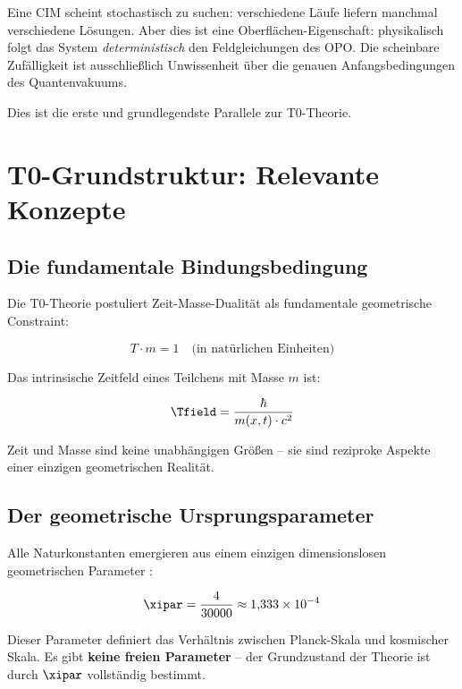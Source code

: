 Eine CIM scheint stochastisch zu suchen: verschiedene Läufe liefern manchmal 
verschiedene Lösungen. Aber dies ist eine Oberflächen-Eigenschaft: physikalisch 
folgt das System \emph{deterministisch} den Feldgleichungen des OPO. Die scheinbare 
Zufälligkeit ist ausschließlich Unwissenheit über die genauen Anfangsbedingungen 
des Quantenvakuums.

Dies ist die erste und grundlegendste Parallele zur T0-Theorie.

\clearpage

\section{T0-Grundstruktur: Relevante Konzepte}
\label{sec:t0}

\subsection{Die fundamentale Bindungsbedingung}

Die T0-Theorie postuliert Zeit-Masse-Dualität als fundamentale geometrische Constraint:

\begin{equation}
    T \cdot m = 1 \quad \text{(in natürlichen Einheiten)}
    \label{eq:t0_constraint}
\end{equation}

Das intrinsische Zeitfeld eines Teilchens mit Masse $m$ ist:

\begin{equation}
    \Tfield = \frac{\hbar}{m(x,t) \cdot c^2}
    \label{eq:t0_timefield}
\end{equation}

Zeit und Masse sind keine unabhängigen Größen -- sie sind reziproke Aspekte einer 
einzigen geometrischen Realität.

\subsection{Der geometrische Ursprungsparameter}

Alle Naturkonstanten emergieren aus einem einzigen dimensionslosen geometrischen 
Parameter \cite{pascher_xi_2025}:

\begin{equation}
    \xipar = \frac{4}{30000} \approx 1{,}333 \times 10^{-4}
    \label{eq:xi_param}
\end{equation}

Dieser Parameter definiert das Verhältnis zwischen Planck-Skala und kosmischer Skala.
Es gibt \textbf{keine freien Parameter} -- der Grundzustand der Theorie ist durch 
$\xipar$ vollständig bestimmt.

